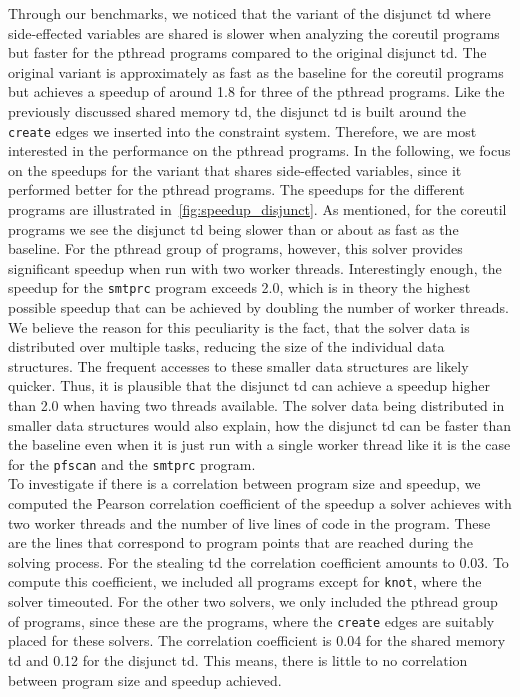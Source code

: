   \noindent Through our benchmarks, we noticed that the variant of the disjunct \ac{td} where side-effected variables are shared is slower when analyzing the coreutil programs but faster for the pthread programs compared to the original disjunct \ac{td}. The original variant is approximately as fast as the baseline for the coreutil programs but achieves a speedup of around 1.8 for three of the pthread programs.
  Like the previously discussed shared memory \ac{td}, the disjunct \ac{td} is built around the \texttt{create} edges we inserted into the constraint system. Therefore, we are most interested in the performance on the pthread programs. In the following, we focus on the speedups for the variant that shares side-effected variables, since it performed better for the pthread programs. The speedups for the different programs are illustrated in~\autoref{fig:speedup_disjunct}. As mentioned, for the coreutil programs we see the disjunct \ac{td} being slower than or about as fast as the baseline. For the pthread group of programs, however, this solver provides significant speedup when run with two worker threads. Interestingly enough, the speedup for the \texttt{smtprc} program exceeds 2.0, which is in theory the highest possible speedup that can be achieved by doubling the number of worker threads. We believe the reason for this peculiarity is the fact, that the solver data is distributed over multiple tasks, reducing the size of the individual data structures. The frequent accesses to these smaller data structures are likely quicker. Thus, it is plausible that the disjunct \ac{td} can achieve a speedup higher than 2.0 when having two threads available. The solver data being distributed in smaller data structures would also explain, how the disjunct \ac{td} can be faster than the baseline even when it is just run with a single worker thread like it is the case for the \texttt{pfscan} and the \texttt{smtprc} program.\\
  To investigate if there is a correlation between program size and speedup, we computed the Pearson correlation coefficient of the speedup a solver achieves with two worker threads and the number of live lines of code in the program. These are the lines that correspond to program points that are reached during the solving process. For the stealing \ac{td} the correlation coefficient amounts to 0.03. To compute this coefficient, we included all programs except for \texttt{knot}, where the solver timeouted. For the other two solvers, we only included the pthread group of programs, since these are the programs, where the \texttt{create} edges are suitably placed for these solvers. The correlation coefficient is 0.04 for the shared memory \ac{td} and 0.12 for the disjunct \ac{td}. This means, there is little to no correlation between program size and speedup achieved.
